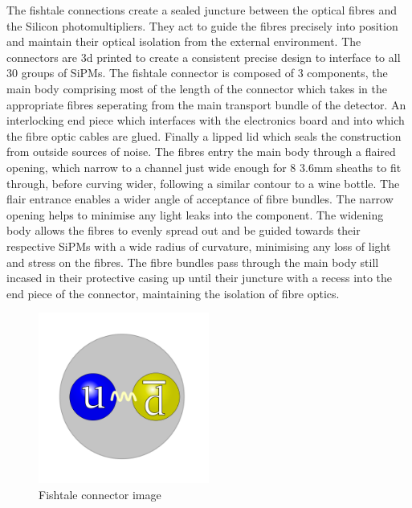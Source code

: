 The fishtale connections create a sealed juncture between the optical fibres and the Silicon photomultipliers. They act to guide the fibres precisely into position and maintain their optical isolation from the external environment. The connectors are 3d printed to create a consistent precise design to interface to all 30 groups of SiPMs. The fishtale connector is composed of 3 components, the main body comprising most of the length of the connector which takes in the appropriate fibres seperating from the main transport bundle of the detector. An interlocking end piece which interfaces with the electronics board and into which the fibre optic cables are glued. Finally a lipped lid which seals the construction from outside sources of noise. The fibres entry the main body through a flaired opening, which narrow to a channel just wide enough for 8 3.6mm sheaths to fit through, before curving wider, following a similar contour to a wine bottle. The flair entrance enables a wider angle of acceptance of fibre bundles. The narrow opening helps to minimise any light leaks into the component. The widening body allows the fibres to evenly spread out and be guided towards their respective SiPMs with a wide radius of curvature, minimising any loss of light and stress on the fibres. The fibre bundles pass through the main body still incased in their protective casing up until their juncture with a recess into the end piece of the connector, maintaining the isolation of fibre optics. 

\begin{figure}[!ht]
	\centering
	\includegraphics[width=0.5\textwidth]{ImgChap1/Meson2}
	\caption{Fishtale connector image}
	\label{FishtaleComplete}
\end{figure}

